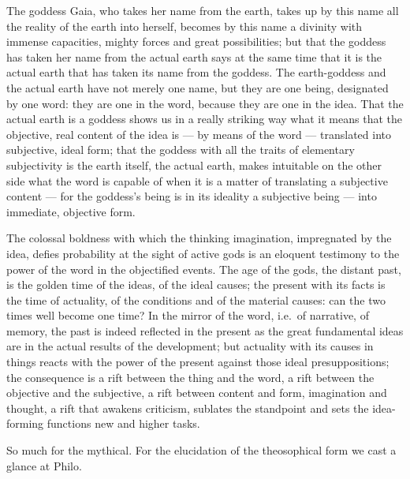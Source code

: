 \documentclass[12pt,a4paper,openany]{book}
\newcommand{\opage}[1]{\marginnote{\footnotesize\textit{[#1]}}}
\begin{document}
The goddess Gaia, who takes her name from the earth, takes up by this name all the reality of the earth into herself,
becomes by this name a divinity with immense capacities, mighty forces and great possibilities; but that the goddess
has taken her name from the actual earth says at the same time that it is the actual earth that has taken its name
from the goddess. The earth-goddess and the actual earth have not merely one name, but they are one being, designated
by one word: they are one in the word, because they are one in the idea. That the actual earth is a goddess shows us
in a really striking way what it means that the objective, real content of the idea is --- by means of the word ---
translated into subjective, ideal form; that the goddess with all the traits of elementary subjectivity is the earth
itself, the actual earth, makes intuitable on the other side what the word is capable of when it is a matter of
translating a subjective content --- for the goddess's being is in its ideality a subjective being --- into
immediate, objective form.

The colossal boldness with which the thinking imagination, impregnated by the idea, defies probability at the sight
of active gods is an eloquent testimony to the power of the word in the objectified events. The age of the gods, the
distant past, is the golden time of the ideas, of the ideal causes; the present with its facts is the time of
actuality, of the conditions and of the material causes: can the two times well become one time? In the mirror of the
word, i.e.\ of narrative, of memory, the past is indeed reflected in the present as the great fundamental ideas are
in the actual results of the development; but actuality with its causes in things reacts with the power of the
present against those
\opage{87}ideal presuppositions; the consequence is a rift between the thing and the word, a rift between the
objective and the subjective, a rift between content and form, imagination and thought, a rift that awakens
criticism, sublates the standpoint and sets the idea-forming functions new and higher tasks.

So much for the mythical. For the elucidation of the theosophical form we cast a glance at Philo.
\end{document}
